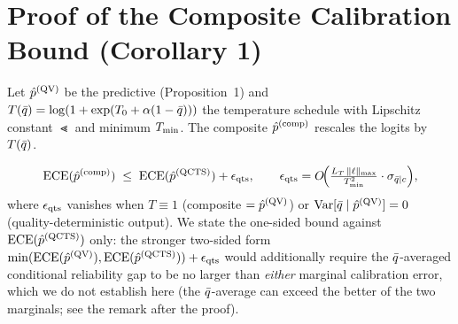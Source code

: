 
\section{Proof of the Composite Calibration Bound (Corollary 1)}\label{app:a3}

Let $\hat{p}^{(\mathrm{QV})}$ be the \qvib{} predictive (Proposition~1) and $T(\bar{q})=\log(1+\exp(T_0+\alpha(1-\bar{q})))$
the \qcts{} temperature schedule with Lipschitz constant $\Lt$ and minimum $T_{\min}$. The
composite $\hat{p}^{(\mathrm{comp})}$ rescales the \qvib{} logits by $T(\bar{q})$.

\begin{corollary}\label{cor:composite}
\begin{equation}
\operatorname{ECE}(\hat{p}^{(\mathrm{comp})}) \;\leq\; \operatorname{ECE}(\hat{p}^{(\mathrm{QCTS})}) + \epsilon_{\mathrm{qts}},
\qquad
\epsilon_{\mathrm{qts}} = O\!\Big(\tfrac{L_T\,\|\ell\|_{\max}}{T_{\min}^2}\cdot\sigma_{\bar{q}\mid c}\Big),
\label{eq:cor1}
\end{equation}
where $\epsilon_{\mathrm{qts}}$ vanishes when $T\equiv 1$ (composite $=\hat{p}^{(\mathrm{QV})}$) or
$\operatorname{Var}[\bar{q}\mid\hat{p}^{(\mathrm{QV})}]=0$ (quality-deterministic output). We state the one-sided bound against
$\operatorname{ECE}(\hat{p}^{(\mathrm{QCTS})})$ only: the stronger two-sided form
$\min(\operatorname{ECE}(\hat{p}^{(\mathrm{QV})}),\operatorname{ECE}(\hat{p}^{(\mathrm{QCTS})}))+\epsilon_{\mathrm{qts}}$ would additionally require the $\bar{q}$-averaged
conditional reliability gap to be no larger than \emph{either} marginal calibration error,
which we do not establish here (the $\bar{q}$-average can exceed the better of the two marginals;
see the remark after the proof).
\end{corollary}

